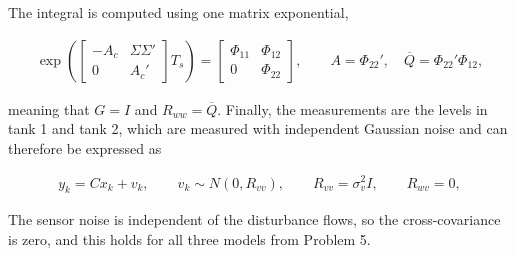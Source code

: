The integral is computed using one matrix exponential,

\begin{align}
  \exp\!\left(\begin{bmatrix}
    -A_c & \Sigma\Sigma' \\
    0 & A_c'
  \end{bmatrix} T_s\right) = \begin{bmatrix}
    \Phi_{11} & \Phi_{12} \\
    0 & \Phi_{22}
  \end{bmatrix}, \qquad A = \Phi_{22}', \quad \overline{Q} = \Phi_{22}'\Phi_{12},
\end{align}

meaning that $G=I$ and $R_{ww} = \overline{Q}$. Finally, the measurements are the levels in tank 1 and tank 2, which are measured with independent Gaussian noise and can therefore be expressed as

\begin{align}
  y_k = Cx_k + v_k, \qquad v_k \sim N(0,R_{vv}), \qquad R_{vv} = \sigma^2_v I, \qquad R_{wv} = 0,
\end{align}

The sensor noise is independent of the disturbance flows, so the cross-covariance is zero, and this holds for all three models from Problem 5.










